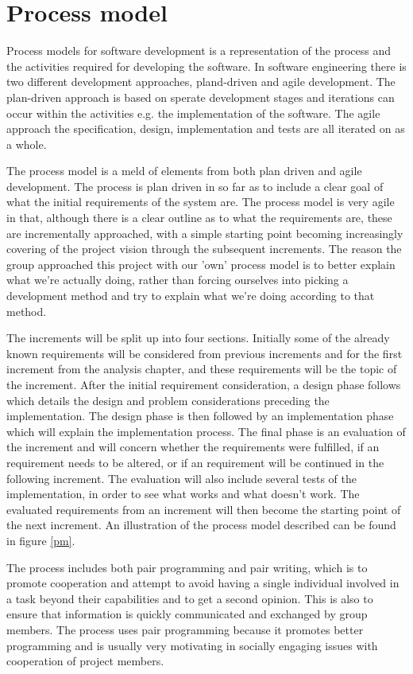 \chapter{Process model}
\label{Process model}
Process models for software development is a representation of the process and the activities required for developing the software. In software engineering there is two different development approaches, pland-driven and agile development. The plan-driven approach is based on sperate development stages and iterations can occur within the activities e.g. the implementation of the software. The agile approach the specification, design, implementation and tests are all iterated on as a whole. \citep{sommerville}

The process model is a meld of elements from both plan driven and agile development. The process is plan driven in so far as to include a clear goal of what the initial requirements of the system are. The process model is very agile in that, although there is a clear outline as to what the requirements are, these are incrementally approached, with a simple starting point becoming increasingly covering of the project vision through the subsequent increments. The reason the group approached this project with our 'own' process model is to better explain what we're actually doing, rather than forcing ourselves into picking a development method and try to explain what we're doing according to that method.

The increments will be split up into four sections. Initially some of the already known requirements will be considered from previous increments and for the first increment from the analysis chapter, and these requirements will be the topic of the increment.
After the initial requirement consideration, a design phase follows which details the design and problem considerations preceding the implementation. The design phase is then followed by an implementation phase which will explain the implementation process. The final phase is an evaluation of the increment and will concern whether the requirements were fulfilled, if an requirement needs to be altered, or if an requirement will be continued in the following increment. The evaluation will also include several tests of the implementation, in order to see what works and what doesn't work. The evaluated requirements from an increment will then become the starting point of the next increment. An illustration of the process model described can be found in figure \ref{pm}.

The process includes both pair programming and pair writing, which is to promote cooperation and attempt to avoid having a single individual involved in a task beyond their capabilities and to get a second opinion. This is also to ensure that information is quickly communicated and exchanged by group members. The process uses pair programming because it promotes better programming and is usually very motivating in socially engaging issues with cooperation of project members.


